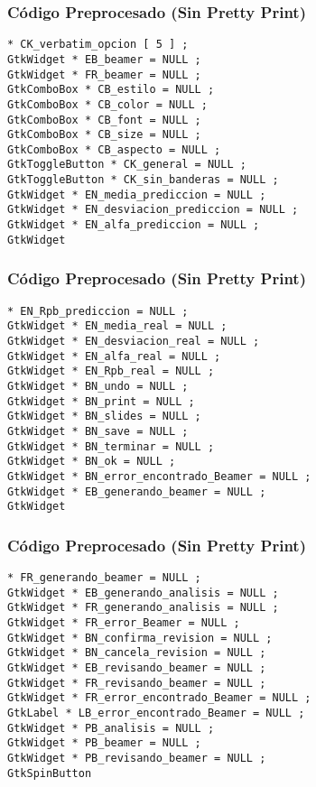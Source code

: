 \documentclass{beamer}
\begin{document}
\begin{frame}[fragile]
\frametitle{C\'odigo Preprocesado (Sin Pretty Print)}
\begin{lstlisting}[style=CStyle]
* CK_verbatim_opcion [ 5 ] ; 
GtkWidget * EB_beamer = NULL ; 
GtkWidget * FR_beamer = NULL ; 
GtkComboBox * CB_estilo = NULL ; 
GtkComboBox * CB_color = NULL ; 
GtkComboBox * CB_font = NULL ; 
GtkComboBox * CB_size = NULL ; 
GtkComboBox * CB_aspecto = NULL ; 
GtkToggleButton * CK_general = NULL ; 
GtkToggleButton * CK_sin_banderas = NULL ; 
GtkWidget * EN_media_prediccion = NULL ; 
GtkWidget * EN_desviacion_prediccion = NULL ; 
GtkWidget * EN_alfa_prediccion = NULL ; 
GtkWidget \end{lstlisting}
\end{frame}
\begin{frame}[fragile]
\frametitle{C\'odigo Preprocesado (Sin Pretty Print)}
\begin{lstlisting}[style=CStyle]
* EN_Rpb_prediccion = NULL ; 
GtkWidget * EN_media_real = NULL ; 
GtkWidget * EN_desviacion_real = NULL ; 
GtkWidget * EN_alfa_real = NULL ; 
GtkWidget * EN_Rpb_real = NULL ; 
GtkWidget * BN_undo = NULL ; 
GtkWidget * BN_print = NULL ; 
GtkWidget * BN_slides = NULL ; 
GtkWidget * BN_save = NULL ; 
GtkWidget * BN_terminar = NULL ; 
GtkWidget * BN_ok = NULL ; 
GtkWidget * BN_error_encontrado_Beamer = NULL ; 
GtkWidget * EB_generando_beamer = NULL ; 
GtkWidget \end{lstlisting}
\end{frame}
\begin{frame}[fragile]
\frametitle{C\'odigo Preprocesado (Sin Pretty Print)}
\begin{lstlisting}[style=CStyle]
* FR_generando_beamer = NULL ; 
GtkWidget * EB_generando_analisis = NULL ; 
GtkWidget * FR_generando_analisis = NULL ; 
GtkWidget * FR_error_Beamer = NULL ; 
GtkWidget * BN_confirma_revision = NULL ; 
GtkWidget * BN_cancela_revision = NULL ; 
GtkWidget * EB_revisando_beamer = NULL ; 
GtkWidget * FR_revisando_beamer = NULL ; 
GtkWidget * FR_error_encontrado_Beamer = NULL ; 
GtkLabel * LB_error_encontrado_Beamer = NULL ; 
GtkWidget * PB_analisis = NULL ; 
GtkWidget * PB_beamer = NULL ; 
GtkWidget * PB_revisando_beamer = NULL ; 
GtkSpinButton \end{lstlisting}
\end{frame}
\end{document}
